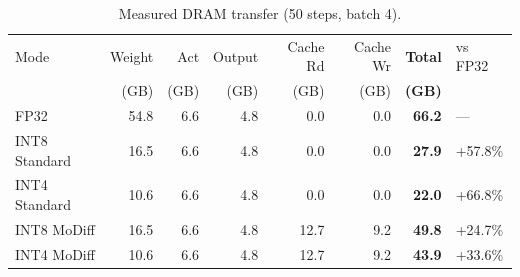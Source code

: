\begin{table}[t]
\centering
\caption{Measured DRAM transfer (50 steps, batch 4).}
\label{tab:memory_transfer}
\begin{tabular}{lrrrrrrl}
\toprule
Mode & Weight & Act & Output & Cache Rd & Cache Wr & \textbf{Total} & vs FP32 \\
 & (GB) & (GB) & (GB) & (GB) & (GB) & \textbf{(GB)} & \\
\midrule
  FP32 & 54.8 & 6.6 & 4.8 & 0.0 & 0.0 & \textbf{66.2} & --- \\
  INT8 Standard & 16.5 & 6.6 & 4.8 & 0.0 & 0.0 & \textbf{27.9} & +57.8\% \\
  INT4 Standard & 10.6 & 6.6 & 4.8 & 0.0 & 0.0 & \textbf{22.0} & +66.8\% \\
  INT8 MoDiff & 16.5 & 6.6 & 4.8 & 12.7 & 9.2 & \textbf{49.8} & +24.7\% \\
  INT4 MoDiff & 10.6 & 6.6 & 4.8 & 12.7 & 9.2 & \textbf{43.9} & +33.6\% \\
\bottomrule
\end{tabular}
\end{table}
